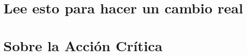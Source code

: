 \documentclass{Tiqqunazo}
\begin{document}









\part{Lee esto para hacer un cambio real}








\part{Sobre la Acción Crítica}








\cite{*}
\printbibliography
\end{document}

